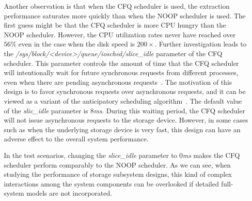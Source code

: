 Another observation is that when the CFQ scheduler is used, the extraction performance saturates more quickly than when the NOOP scheduler is used. The first guess might be that the CFQ scheduler is more CPU hungry than the NOOP scheduler. However, the CPU utilization rates never have reached over $56\%$ even in the case when the disk speed is $200\times$. Further investigation leads to the \textit{/sys\slash block\slash <device>\slash queue\slash iosched\slash slice_idle} %
parameter of the CFQ scheduler. This parameter controls the amount of time that the CFQ scheduler will intentionally wait for future synchronous requests from different processes, even when there are pending asynchronous requests~\cite{Layton:2009}. The motivation of this design is to favor synchronous requests over asynchronous requests, and it can be viewed as a variant of the anticipatory scheduling algorithm~\cite{Iyer:2001}. The default value of the \textit{slic_idle} parameter is 8\textit{ms}. During this waiting period, the CFQ scheduler will not issue asynchronous requests to the storage device. However, in some cases such as when the underlying storage device is very fast, this design can have an adverse effect to the overall system performance.

In the test scenarios, changing the \textit{slice_idle} parameter to 0\textit{ms} makes the CFQ scheduler perform comparably to the NOOP scheduler. As we can see, when studying the performance of storage subsystem designs, this kind of complex interactions among the system components can be overlooked if detailed full-system models are not incorporated.

